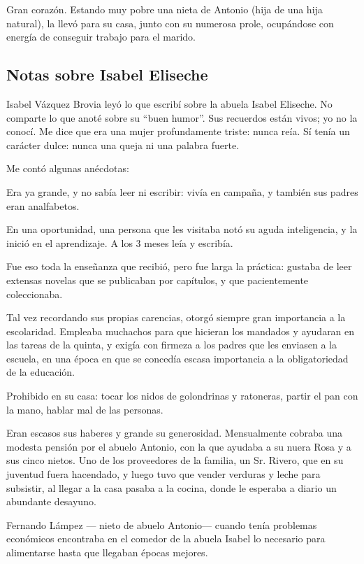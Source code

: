 \documentclass[a4paper]{article}
\begin{document}
Gran corazón. Estando muy pobre una nieta de Antonio (hija de una hija natural), la llevó para su casa, junto con su numerosa prole, ocupándose con energía de conseguir trabajo para el marido.

\subsection{Notas sobre Isabel Eliseche}

Isabel Vázquez Brovia leyó lo que escribí sobre la abuela Isabel Eliseche. No comparte lo que anoté sobre su ``buen humor''. Sus recuerdos están vivos; yo no la conocí. Me dice que era una mujer profundamente triste: nunca reía. Sí tenía un carácter dulce: nunca una queja ni una palabra fuerte.

Me contó algunas anécdotas:

\bigbreak{}

Era ya grande, y no sabía leer ni escribir: vivía en campaña, y también sus padres eran analfabetos.

En una oportunidad, una persona que les visitaba notó su aguda inteligencia, y la inició en el aprendizaje. A los 3 meses leía y escribía.

Fue eso toda la enseñanza que recibió, pero fue larga la práctica: gustaba de leer extensas novelas que se publicaban por capítulos, y que pacientemente coleccionaba.

Tal vez recordando sus propias carencias, otorgó siempre gran importancia a la escolaridad. Empleaba muchachos para que hicieran los mandados y ayudaran en las tareas de la quinta, y exigía con firmeza a los padres que les enviasen a la escuela, en una época en que se concedía escasa importancia a la obligatoriedad de la educación.

Prohibido en su casa: tocar los nidos de golondrinas y ratoneras, partir el pan con la mano, hablar mal de las personas.

Eran escasos sus haberes y grande su generosidad. Mensualmente cobraba una modesta pensión por el abuelo Antonio, con la que ayudaba a su nuera Rosa y a sus cinco nietos. Uno de los proveedores de la familia, un Sr. Rivero, que en su juventud fuera hacendado, y luego tuvo que vender verduras y leche para subsistir, al llegar a la casa pasaba a la cocina, donde le esperaba a diario un abundante desayuno.

Fernando Lámpez --- nieto de abuelo Antonio--- cuando tenía problemas e\-co\-nó\-mi\-cos encontraba en el comedor de la abuela Isabel lo necesario para alimentarse hasta que llegaban épocas mejores.
\end{document}
